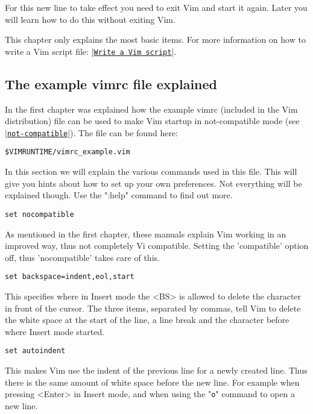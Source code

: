 For this new line to take effect you need to exit Vim and start it again.
Later you will learn how to do this without exiting Vim.

This chapter only explains the most basic items.
For more information on how to write a Vim script file: |\hyperref[Write a Vim script]{\texttt{Write a Vim script}}|.

\subsection{The example vimrc file explained}
\label{vimrc_example.vim}

In the first chapter was explained how the example vimrc (included in the Vim distribution) file can be used to make Vim startup in not-compatible mode (see \hyperref[not-compatible]{|\texttt{not-compatible}|}).
The file can be found here:

\begin{Verbatim}[samepage=true]
    $VIMRUNTIME/vimrc_example.vim 
\end{Verbatim}

In this section we will explain the various commands used in this file.
This will give you hints about how to set up your own preferences.
Not everything will be explained though.
Use the ":help" command to find out more.

 \begin{Verbatim}[samepage=true]
 set nocompatible
 \end{Verbatim}

As mentioned in the first chapter, these manuals explain Vim working in an improved way, thus not completely Vi compatible.
Setting the 'compatible' option off, thus 'nocompatible' takes care of this.

 \begin{Verbatim}[samepage=true]
 set backspace=indent,eol,start
 \end{Verbatim}

This specifies where in Insert mode the <BS> is allowed to delete the character in front of the cursor.
The three items, separated by commas, tell Vim to delete the white space at the start of the line, a line break and the character before where Insert mode started.

 \begin{Verbatim}[samepage=true]
 set autoindent
 \end{Verbatim}

This makes Vim use the indent of the previous line for a newly created line.
Thus there is the same amount of white space before the new line.
For example when pressing <Enter> in Insert mode, and when using the "\verb!o!" command to open a new line.

